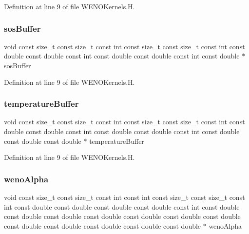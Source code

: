 Definition at line 9 of file W\+E\+N\+O\+Kernels.\+H.

\hypertarget{WENOKernels_8H_ad2e7242a5875e6d926fcdf5e83d45e41}{}\label{WENOKernels_8H_ad2e7242a5875e6d926fcdf5e83d45e41} 
\subsubsection{\texorpdfstring{sos\+Buffer}{sosBuffer}}
{\footnotesize\ttfamily void const size\+\_\+t const size\+\_\+t const int const size\+\_\+t const size\+\_\+t const int const double const double const int const double const double const int const double $\ast$ sos\+Buffer}



Definition at line 9 of file W\+E\+N\+O\+Kernels.\+H.

\hypertarget{WENOKernels_8H_a81c39e1ec75a82e2a4ece4c61c356f36}{}\label{WENOKernels_8H_a81c39e1ec75a82e2a4ece4c61c356f36} 
\subsubsection{\texorpdfstring{temperature\+Buffer}{temperatureBuffer}}
{\footnotesize\ttfamily void const size\+\_\+t const size\+\_\+t const int const size\+\_\+t const size\+\_\+t const int const double const double const int const double const double const int const double const double const double $\ast$ temperature\+Buffer}



Definition at line 9 of file W\+E\+N\+O\+Kernels.\+H.

\hypertarget{WENOKernels_8H_acfc9f23d594a43139ede4d58dc6a9cb8}{}\label{WENOKernels_8H_acfc9f23d594a43139ede4d58dc6a9cb8} 
\subsubsection{\texorpdfstring{weno\+Alpha}{wenoAlpha}}
{\footnotesize\ttfamily void const size\+\_\+t const size\+\_\+t const int const int const size\+\_\+t const size\+\_\+t const int const double const double const double const double const int const double const double const double const double const double const double const double const double const double const double const double const double $\ast$ weno\+Alpha}



